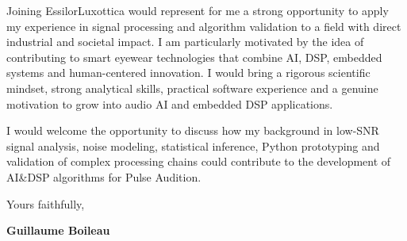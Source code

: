 \documentclass[11pt,a4paper]{../_shared/altacv}
\begin{document}
{Joining EssilorLuxottica would represent for me a strong opportunity to apply my experience in signal processing and algorithm validation to a field with direct industrial and societal impact. I am particularly motivated by the idea of contributing to smart eyewear technologies that combine AI, DSP, embedded systems and human-centered innovation. I would bring a rigorous scientific mindset, strong analytical skills, practical software experience and a genuine motivation to grow into audio AI and embedded DSP applications.

I would welcome the opportunity to discuss how my background in low-SNR signal analysis, noise modeling, statistical inference, Python prototyping and validation of complex processing chains could contribute to the development of AI\&DSP algorithms for Pulse Audition.

Yours faithfully,

\textbf{Guillaume Boileau}

}
\end{document}
